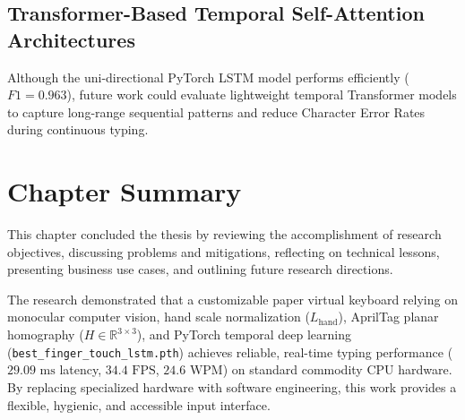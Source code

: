 \subsection{Transformer-Based Temporal Self-Attention Architectures}
Although the uni-directional PyTorch LSTM model performs efficiently ($F1 = 0.963$), future work could evaluate lightweight temporal Transformer models to capture long-range sequential patterns and reduce Character Error Rates during continuous typing.

\section{Chapter Summary}
\label{sec:concl_summary}
This chapter concluded the thesis by reviewing the accomplishment of research objectives, discussing problems and mitigations, reflecting on technical lessons, presenting business use cases, and outlining future research directions.

The research demonstrated that a customizable paper virtual keyboard relying on monocular computer vision, hand scale normalization ($L_{\text{hand}}$), AprilTag planar homography ($H \in \mathbb{R}^{3 \times 3}$), and PyTorch temporal deep learning (\texttt{best\allowbreak\_finger\allowbreak\_touch\allowbreak\_lstm.pth}) achieves reliable, real-time typing performance ($29.09\text{ ms}$ latency, $34.4\text{ FPS}$, $24.6\text{ WPM}$) on standard commodity CPU hardware. By replacing specialized hardware with software engineering, this work provides a flexible, hygienic, and accessible input interface.
